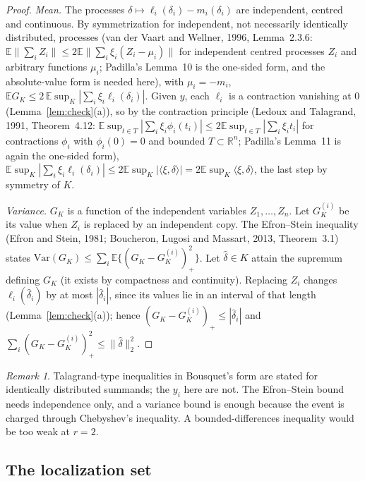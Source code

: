 \documentclass[11pt]{article}
\theoremstyle{definition}
\theoremstyle{remark}
\newtheorem{remark}{Remark}
\newcommand{\R}{\mathbb{R}}
\newcommand{\E}{\mathbb{E}}
\begin{document}
\begin{proof}
\emph{Mean.} The processes $\delta\mapsto\ell_i(\delta_i)-m_i(\delta_i)$ are independent, centred and continuous. By symmetrization for independent, not necessarily identically distributed, processes (van der Vaart and Wellner, 1996, Lemma~2.3.6: $\E\|\sum_iZ_i\|\le2\E\|\sum_i\xi_i(Z_i-\mu_i)\|$ for independent centred processes $Z_i$ and arbitrary functions $\mu_i$; Padilla's Lemma~10 is the one-sided form, and the absolute-value form is needed here), with $\mu_i=-m_i$, $\E G_K\le2\,\E\sup_K|\sum_i\xi_i\ell_i(\delta_i)|$. Given $y$, each $\ell_i$ is a contraction vanishing at $0$ (Lemma~\ref{lem:check}(a)), so by the contraction principle (Ledoux and Talagrand, 1991, Theorem~4.12: $\E\sup_{t\in T}|\sum_i\xi_i\phi_i(t_i)|\le2\E\sup_{t\in T}|\sum_i\xi_it_i|$ for contractions $\phi_i$ with $\phi_i(0)=0$ and bounded $T\subset\R^n$; Padilla's Lemma~11 is again the one-sided form), $\E\sup_K|\sum_i\xi_i\ell_i(\delta_i)|\le2\E\sup_K|\langle\xi,\delta\rangle|=2\E\sup_K\langle\xi,\delta\rangle$, the last step by symmetry of $K$.

\emph{Variance.} $G_K$ is a function of the independent variables $Z_1,\dots,Z_n$. Let $G_K^{(i)}$ be its value when $Z_i$ is replaced by an independent copy. The Efron--Stein inequality (Efron and Stein, 1981; Boucheron, Lugosi and Massart, 2013, Theorem~3.1) states $\mathrm{Var}(G_K)\le\sum_i\E\{(G_K-G_K^{(i)})_+^2\}$. Let $\hat\delta\in K$ attain the supremum defining $G_K$ (it exists by compactness and continuity). Replacing $Z_i$ changes $\ell_i(\hat\delta_i)$ by at most $|\hat\delta_i|$, since its values lie in an interval of that length (Lemma~\ref{lem:check}(a)); hence $(G_K-G_K^{(i)})_+\le|\hat\delta_i|$ and $\sum_i(G_K-G_K^{(i)})_+^2\le\|\hat\delta\|_2^2$.
\end{proof}

\begin{remark}
Talagrand-type inequalities in Bousquet's form are stated for identically distributed summands; the $y_i$ here are not. The Efron--Stein bound needs independence only, and a variance bound is enough because the event is charged through Chebyshev's inequality. A bounded-differences inequality would be too weak at $r=2$.
\end{remark}

\subsection{The localization set}
\end{document}

